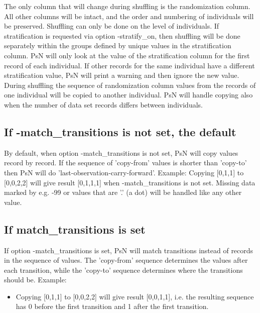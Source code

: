 The only column that will change during shuffling is the randomization column. All other columns will be intact, and the order and numbering of individuals will be preserved. Shuffling can only be done on the level of individuals. If stratification is requested via option -stratify\_on, then shuffling will be done separately within the groups defined by unique values in the stratification column. PsN will only look at the value of the stratification column for the first record of each individual. If other records for the same individual have a different stratification value, PsN will print a warning and then ignore the new value.
During shuffling the sequence of randomization column values from the records of one individual will be copied to another individual. PsN will handle copying also when the number of data set records differs between individuals.

\subsection{If -match\_transitions is not set, the default}

By default, when option -match\_transitions is not set, PsN will copy values record by record. If the sequence of 'copy-from' values is shorter than 'copy-to' then PsN will do 'last-observation-carry-forward'. Example: 
Copying [0,1,1] to [0,0,2,2] will give result [0,1,1,1] when -match\_transitions is not set. Missing data marked by e.g. -99 or values that are '.' (a dot) will be handled like any other value. 

\subsection{If match\_transitions is set}

If option -match\_transitions is set, PsN will match transitions instead of records in the sequence of values. The 'copy-from' sequence determines the values after each transition, while the 'copy-to' sequence determines where the transitions should be. Example: 
\begin{itemize}
\item Copying [0,1,1] to [0,0,2,2] will give result [0,0,1,1], i.e. the resulting sequence has 0 before the first transition and 1 after the first transition. 
\end{itemize}


